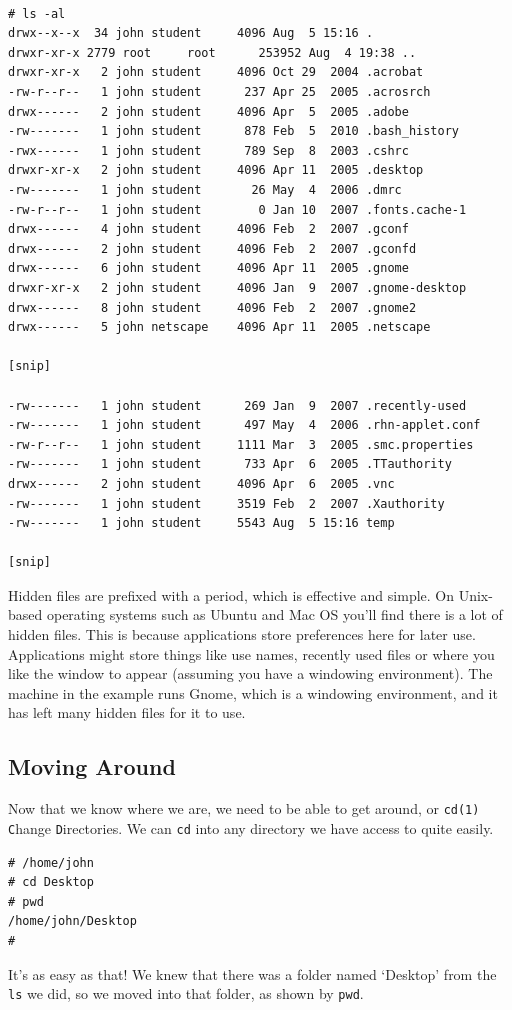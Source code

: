 {\tt
\begin{verbatim}
# ls -al
drwx--x--x  34 john student     4096 Aug  5 15:16 .
drwxr-xr-x 2779 root     root      253952 Aug  4 19:38 ..
drwxr-xr-x   2 john student     4096 Oct 29  2004 .acrobat
-rw-r--r--   1 john student      237 Apr 25  2005 .acrosrch
drwx------   2 john student     4096 Apr  5  2005 .adobe
-rw-------   1 john student      878 Feb  5  2010 .bash_history
-rwx------   1 john student      789 Sep  8  2003 .cshrc
drwxr-xr-x   2 john student     4096 Apr 11  2005 .desktop
-rw-------   1 john student       26 May  4  2006 .dmrc
-rw-r--r--   1 john student        0 Jan 10  2007 .fonts.cache-1
drwx------   4 john student     4096 Feb  2  2007 .gconf
drwx------   2 john student     4096 Feb  2  2007 .gconfd
drwx------   6 john student     4096 Apr 11  2005 .gnome
drwxr-xr-x   2 john student     4096 Jan  9  2007 .gnome-desktop
drwx------   8 john student     4096 Feb  2  2007 .gnome2
drwx------   5 john netscape    4096 Apr 11  2005 .netscape

[snip]

-rw-------   1 john student      269 Jan  9  2007 .recently-used
-rw-------   1 john student      497 May  4  2006 .rhn-applet.conf
-rw-r--r--   1 john student     1111 Mar  3  2005 .smc.properties
-rw-------   1 john student      733 Apr  6  2005 .TTauthority
drwx------   2 john student     4096 Apr  6  2005 .vnc
-rw-------   1 john student     3519 Feb  2  2007 .Xauthority
-rw-------   1 john student     5543 Aug  5 15:16 temp

[snip]
\end{verbatim}
}

Hidden files are prefixed with a period, which is effective and simple.  
On Unix-based operating systems such as Ubuntu and Mac OS you'll find 
there is a lot of hidden files.  This is because applications store 
preferences here for later use.  Applications
might store things like use names, recently used files or where you like 
the window to appear (assuming you have a windowing environment).
The machine in the example runs Gnome, which is a windowing environment, and it has left many hidden files for it to use.

\subsection{Moving Around}
Now that we know where we are, we need to be able to get around, or {\tt cd(1)} {\tt C}hange {\tt D}irectories.
We can {\tt cd} into any directory we have access to quite easily.
{\tt \begin{verbatim}
# /home/john
# cd Desktop
# pwd
/home/john/Desktop
#
\end{verbatim}
}
It's as easy as that! We knew that there was a folder named `Desktop' from the {\tt ls} 
we did, so we moved into that folder, as shown by {\tt pwd}.

